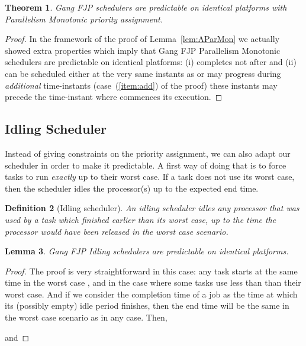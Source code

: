 \documentclass[a4paper]{article}
\newtheorem{theorem}{Theorem}
\newtheorem{definition}[theorem]{Definition}
\newtheorem{lemma}[theorem]{Lemma}
\begin{document}
\begin{theorem}\label{thm:predParMon} Gang FJP schedulers are predictable on identical platforms with Parallelism Monotonic priority assignment.
\end{theorem}
\begin{proof}
In the framework of the proof of Lemma~\ref{lem:AParMon} we actually showed extra properties which imply that Gang FJP Parallelism Monotonic schedulers are predictable on identical platforms: (i)  completes not after  and (ii)  can be scheduled either at the very same instants as  or may progress during \emph{additional} time-instants (case~(\ref{item:add}) of the proof) these instants may precede the time-instant where  commences its execution.
\end{proof}

\subsection{Idling Scheduler}

Instead of giving constraints on the priority assignment, we can also adapt our scheduler in order to make it predictable. A first way of doing that is to force tasks to run \emph{exactly} up to their worst case. If a task does not use its worst case, then the scheduler idles the processor(s) up to the expected end time.

\begin{definition}[Idling scheduler]
An \emph{idling scheduler} idles any processor that was used by a task which finished earlier than its worst case, up to the time the processor would have been released in the worst case scenario.
\end{definition}

\begin{lemma}\label{lemma:predIdling} Gang FJP Idling schedulers are predictable on identical platforms.
\end{lemma}

\begin{proof}
The proof is very straightforward in this case: any task starts at the same time in the worst case , and in the case where some tasks use less than than their worst case. And if we consider the completion time of a job as the time at which its (possibly empty) idle period finishes, then the end time will be the same in the worst case scenario as in any case. Then,

 
and 

\end{proof}
\end{document}
